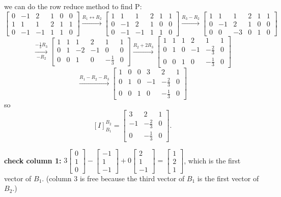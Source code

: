 \documentclass{article}
\begin{document}
we can do the row reduce method to find P:
\[
\left[\begin{array}{rrr|rrr}
0 & -1 & 2 & 1 & 0 & 0 \\
1 & 1 & 1 & 2 & 1 & 1 \\
0 & -1 & -1 & 1 & 1 & 0
\end{array}\right]
\xrightarrow{R_1 \leftrightarrow R_2}
\left[\begin{array}{rrr|rrr}
1 & 1 & 1 & 2 & 1 & 1 \\
0 & -1 & 2 & 1 & 0 & 0 \\
0 & -1 & -1 & 1 & 1 & 0
\end{array}\right]
\xrightarrow{R_3 - R_2}
\left[\begin{array}{rrr|rrr}
1 & 1 & 1 & 2 & 1 & 1 \\
0 & -1 & 2 & 1 & 0 & 0 \\
0 & 0 & -3 & 0 & 1 & 0
\end{array}\right]
\]
\[
\xrightarrow[-R_2]{-\frac{1}{3}R_3}
\left[\begin{array}{rrr|rrr}
1 & 1 & 1 & 2 & 1 & 1 \\
0 & 1 & -2 & -1 & 0 & 0 \\
0 & 0 & 1 & 0 & -\frac{1}{3} & 0
\end{array}\right]
\xrightarrow{R_2 + 2R_3}
\left[\begin{array}{rrr|rrr}
1 & 1 & 1 & 2 & 1 & 1 \\
0 & 1 & 0 & -1 & -\frac{2}{3} & 0 \\
0 & 0 & 1 & 0 & -\frac{1}{3} & 0
\end{array}\right]
\]
\[
\xrightarrow{R_1 - R_2 - R_3}
\left[\begin{array}{rrr|rrr}
1 & 0 & 0 & 3 & 2 & 1 \\
0 & 1 & 0 & -1 & -\frac{2}{3} & 0 \\
0 & 0 & 1 & 0 & -\frac{1}{3} & 0
\end{array}\right]
\]
so
\[
[I]_{B_1}^{B_2} = \begin{bmatrix}
3 & 2 & 1 \\
-1 & -\frac{2}{3} & 0 \\
0 & -\frac{1}{3} & 0
\end{bmatrix}.
\]

\textbf{check column 1:} $3\begin{bmatrix} 0 \\ 1 \\ 0 \end{bmatrix}
- \begin{bmatrix} -1 \\ 1 \\ -1 \end{bmatrix}
+ 0\begin{bmatrix} 2 \\ 1 \\ -1 \end{bmatrix}
= \begin{bmatrix} 1 \\ 2 \\ 1 \end{bmatrix}$, which is the first vector of $B_1$.
(column 3 is free because the third vector of $B_1$ is the first vector of $B_2$.)
\end{document}
